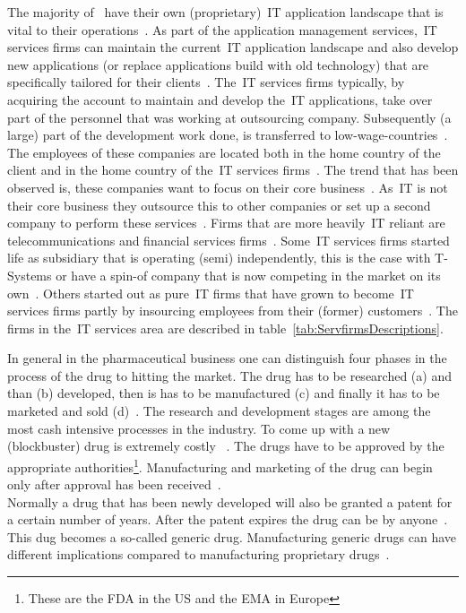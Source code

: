 The majority of \mne~have their own (proprietary)~\gls{IT} application landscape that is vital to their operations~\citep{Willcocks:2004ce}. 
As part of the application management services,~\gls{IT} services firms can maintain the current~\gls{IT} application landscape and also develop new applications (or replace applications build with old technology) that are specifically tailored for their clients~\citep{Cusumano:2008ta}.
The~\gls{IT} services firms typically, by acquiring the account to maintain and develop the~\gls{IT} applications, take over part of the personnel that was working at outsourcing company. 
Subsequently (a large) part of the development work done, is transferred to low-wage-countries~\citep{Barthelemy:2001ui}. 
The employees of these companies are located both in the home country of the client and in the home country of the~\gls{IT} services firms~\citep{Lacity:2009dk}.
The trend that has been observed is, these companies want to focus on their core business~\citep{Willcocks:2004ce}. 
As~\gls{IT} is not their core business they outsource this to other companies or set up a second company to perform these services~\citep{Earl:2012vd}. 
Firms that are more heavily~\gls{IT} reliant are telecommunications and financial services firms~\citep{Gonzalez:2006eh}. 
Some~\gls{IT} services firms started life as subsidiary that is operating (semi) independently, this is the case with T-Systems or have a spin-of company that is now competing in the market on its own~\citep{T-systems:2013}. 
Others started out as pure~\gls{IT} firms that have grown to become~\gls{IT} services firms partly by insourcing employees from their (former) customers~\citep{Barthelemy:2001ui}. 
The firms in the~\gls{IT} services area are described in table~\ref{tab:ServfirmsDescriptions}.




In general in the pharmaceutical business one can distinguish four phases in the process of the drug to hitting the market.
The drug has to be researched (a) and than (b) developed, then is has to be manufactured (c) and finally it has to be marketed and sold (d)~\citep{Paul:2010ff}. 
The research and development stages are among the most cash intensive processes in the \pharma industry.
To come up with a new (blockbuster) drug is extremely costly~\citep{Munos:2009bg} .
The drugs have to be approved by the appropriate authorities\footnote{These are the \gls{FDA} in the US and the \gls{EMA} in Europe}. 
Manufacturing and marketing of the drug can begin only after approval has been received~\citep{Kessel:2011go}.\\
Normally a drug that has been newly developed will also be granted a patent for a certain number of years. 
After the patent expires the drug can be \manu by anyone~\citep{Kaitin:2009dg}.
This dug becomes a so-called generic drug. 
Manufacturing generic drugs can have different implications compared to manufacturing proprietary drugs~\citep{Kessel:2011go}.

